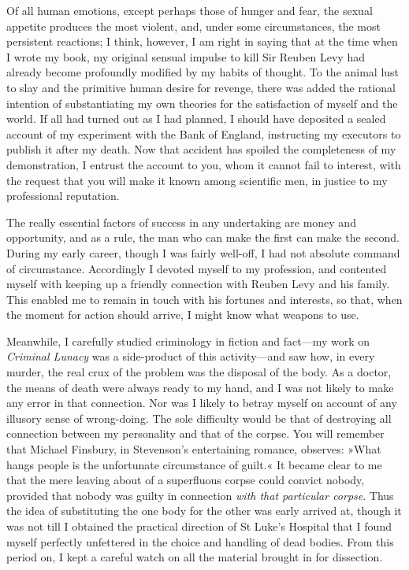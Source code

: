 Of all human emotions, except perhaps those of hunger and fear, the sexual appetite produces the most violent, and, under some circumstances, the most persistent reactions; I think, however, I am right in saying that at the time when I wrote my book, my original sensual impulse to kill Sir Reuben Levy had already become profoundly modified by my habits of thought. To the animal lust to slay and the primitive human desire for revenge, there was added the rational intention of substantiating my own theories for the satisfaction of myself and the world. If all had turned out as I had planned, I should have deposited a sealed account of my experiment with the Bank of England, instructing my executors to publish it after my death. Now that accident has spoiled the completeness of my demonstration, I entrust the account to you, whom it cannot fail to interest, with the request that you will make it known among scientific men, in justice to my professional reputation.

The really essential factors of success in any undertaking are money and opportunity, and as a rule, the man who can make the first can make the second. During my early career, though I was fairly well-off, I had not absolute command of circumstance. Accordingly I devoted myself to my profession, and contented myself with keeping up a friendly connection with Reuben Levy and his family. This enabled me to remain in touch with his fortunes and interests, so that, when the moment for action should arrive, I might know what weapons to use.

Meanwhile, I carefully studied criminology in fiction and fact—my work on \textit{Criminal Lunacy} was a side-product of this activity—and saw how, in every murder, the real crux of the problem was the disposal of the body. As a doctor, the means of death were always ready to my hand, and I was not likely to make any error in that connection. Nor was I likely to betray myself on account of any illusory sense of wrong-doing. The sole difficulty would be that of destroying all connection between my personality and that of the corpse. You will remember that Michael Finsbury, in Stevenson's entertaining romance, observes: »What hangs people is the unfortunate circumstance of guilt.« It became clear to me that the mere leaving about of a superfluous corpse could convict nobody, provided that nobody was guilty in connection \textit{with that particular corpse}. Thus the idea of substituting the one body for the other was early arrived at, though it was not till I obtained the practical direction of St Luke's Hospital that I found myself perfectly unfettered in the choice and handling of dead bodies. From this period on, I kept a careful watch on all the material brought in for dissection.

